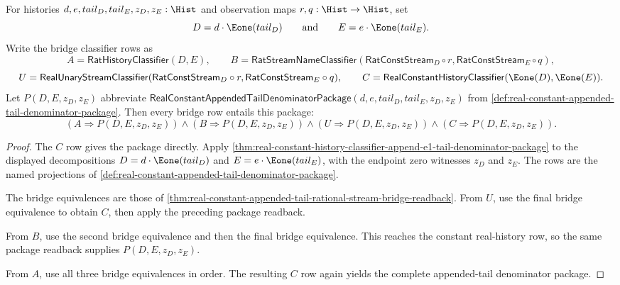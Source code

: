 \begin{theorem}
\label{thm:real-constant-appended-tail-bridge-denominator-package}
For histories $d,e,tail_D,tail_E,z_D,z_E:\Hist$ and observation maps
$r,q:\Hist\to\Hist$, set
$$
D=d\cdot\Eone(tail_D)
\qquad\text{and}\qquad
E=e\cdot\Eone(tail_E).
$$
Write the bridge classifier rows as
$$
A=\mathsf{RatHistoryClassifier}(D,E),
\qquad
B=\mathsf{RatStreamNameClassifier}(\mathsf{RatConstStream}_D\circ r,
\mathsf{RatConstStream}_E\circ q),
$$
$$
U=\mathsf{RealUnaryStreamClassifier}(\mathsf{RatConstStream}_D\circ r,
\mathsf{RatConstStream}_E\circ q),
\qquad
C=\mathsf{RealConstantHistoryClassifier}(\Eone(D),\Eone(E)).
$$
Let $P(D,E,z_D,z_E)$ abbreviate
$\mathsf{RealConstantAppendedTailDenominatorPackage}
(d,e,tail_D,tail_E,z_D,z_E)$ from
\autoref{def:real-constant-appended-tail-denominator-package}.
Then every bridge row entails this package:
$$
(A\Longrightarrow P(D,E,z_D,z_E))\land
(B\Longrightarrow P(D,E,z_D,z_E))\land
(U\Longrightarrow P(D,E,z_D,z_E))\land
(C\Longrightarrow P(D,E,z_D,z_E)).
$$
\end{theorem}
\begin{proof}
The $C$ row gives the package directly. Apply
\autoref{thm:real-constant-history-classifier-append-e1-tail-denominator-package}
to the displayed decompositions $D=d\cdot\Eone(tail_D)$ and
$E=e\cdot\Eone(tail_E)$, with the endpoint zero witnesses $z_D$ and $z_E$.
The rows are the named projections of
\autoref{def:real-constant-appended-tail-denominator-package}.

The bridge equivalences are those of
\autoref{thm:real-constant-appended-tail-rational-stream-bridge-readback}.
From $U$, use the final bridge equivalence to obtain $C$, then apply the
preceding package readback.

From $B$, use the second bridge equivalence and then the final bridge
equivalence. This reaches the constant real-history row, so the same package
readback supplies $P(D,E,z_D,z_E)$.

From $A$, use all three bridge equivalences in order. The resulting $C$ row
again yields the complete appended-tail denominator package.
\end{proof}

